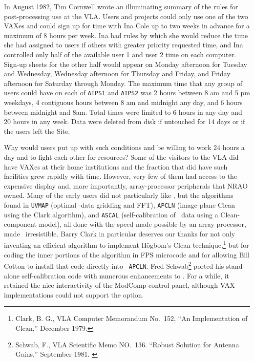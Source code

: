 In August 1982, Tim Cornwell wrote an illuminating summary of the
rules for post-processing use at the \hbox{VLA}.  Users and projects
could only use one of the two VAXes and could sign up for time with
Ina Cole up to two weeks in advance for a maximum of 8 hours per week.
Ina had rules by which she would reduce the time she had assigned to
users if others with greater priority requested time, and Ina
controlled only half of the available user 1 and user 2 time on each
computer.  Sign-up sheets for the other half would appear on Monday
afternoon for Tuesday and Wednesday, Wednesday afternoon for Thursday
and Friday, and Friday afternoon for Saturday through Monday.  The
maximum time that any group of users could have on each of {\tt AIPS1}
and {\tt AIPS2} was 2 hours between 8 am and 5 pm weekdays, 4
contiguous hours between 8 am and midnight any day, and 6 hours
between midnight and 8am.  Total times were limited to 6 hours in any
day and 20 hours in any week.  Data were deleted from disk if
untouched for 14 days or if the users left the Site.

Why would users put up with such conditions and be willing to work 24
hours a day and to fight each other for resources?  Some of the
visitors to the VLA did have VAXes at their home institutions and the
fraction that did have such facilities grew rapidly with time.
However, very few of them had access to the expensive display and,
more importantly, array-processor peripherals that NRAO owned.  Many
of the early users did not particularly like \AIPS, but the algorithms
found in {\tt UVMAP} (optimal \uv-data gridding and FFT), {\tt APCLN}
(image-plane Clean using the Clark algorithm), and {\tt ASCAL}
(self-calibration of \uv\ data using a Clean-component model), all
done with the speed made possible by an array processor, made \AIPS\
irresistible.  Barry Clark in particular deserves our thanks for not
only inventing an efficient algorithm to implement H\"ogbom's Clean
technique,\footnote{Clark, B. G., VLA Computer Memorandum No.~152, ``An
Implementation of Clean,'' December 1979.\label{fn:C1979}} but for
coding the inner portions of the algorithm in FPS microcode and for
allowing Bill Cotton to install that code directly into \hbox{{\tt
APCLN}}.  Fred Schwab\footnote{Schwab, F., VLA Scientific Memo
NO.~136. ``Robust Solution for Antenna Gains,'' September 1981.
\label{fn:S1981}} ported his stand-alone self-calibration code with
numerous enhancements to \hbox{\AIPS}.  For a while, it retained the
nice interactivity of the ModComp control panel, although VAX
implementations could not support the option.

